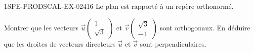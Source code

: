 \begin{exercice}{1SPE-PRODSCAL-EX-024}{1}{6}
Le plan est rapporté à un repère orthonormé.

Montrer que les vecteurs $\vec{u}\begin{pmatrix} 1 \\ \sqrt{3} \end{pmatrix}$ et $\vec{v}\begin{pmatrix} \sqrt{3} \\ -1 \end{pmatrix}$ sont orthogonaux. En déduire que les droites de vecteurs directeurs $\vec{u}$ et $\vec{v}$ sont perpendiculaires.
\end{exercice}
